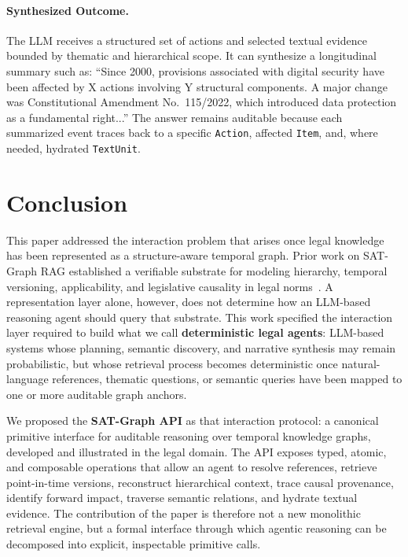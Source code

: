 \documentclass[11pt]{article}
\begin{document}
\paragraph{Synthesized Outcome.}
The LLM receives a structured set of actions and selected textual evidence bounded by thematic and hierarchical scope. It can synthesize a longitudinal summary such as: ``Since 2000, provisions associated with digital security have been affected by X actions involving Y structural components. A major change was Constitutional Amendment No.~115/2022, which introduced data protection as a fundamental right...'' The answer remains auditable because each summarized event traces back to a specific \texttt{Action}, affected \texttt{Item}, and, where needed, hydrated \texttt{TextUnit}.

\section{Conclusion}
\label{sec:conclusion}

This paper addressed the interaction problem that arises once legal knowledge has been represented as a structure-aware temporal graph. Prior work on SAT-Graph RAG established a verifiable substrate for modeling hierarchy, temporal versioning, applicability, and legislative causality in legal norms~\cite{demartim2025graphrag}. A representation layer alone, however, does not determine how an LLM-based reasoning agent should query that substrate. This work specified the interaction layer required to build what we call \textbf{deterministic legal agents}: LLM-based systems whose planning, semantic discovery, and narrative synthesis may remain probabilistic, but whose retrieval process becomes deterministic once natural-language references, thematic questions, or semantic queries have been mapped to one or more auditable graph anchors.

We proposed the \textbf{SAT-Graph API} as that interaction protocol: a canonical primitive interface for auditable reasoning over temporal knowledge graphs, developed and illustrated in the legal domain. The API exposes typed, atomic, and composable operations that allow an agent to resolve references, retrieve point-in-time versions, reconstruct hierarchical context, trace causal provenance, identify forward impact, traverse semantic relations, and hydrate textual evidence. The contribution of the paper is therefore not a new monolithic retrieval engine, but a formal interface through which agentic reasoning can be decomposed into explicit, inspectable primitive calls.
\end{document}
